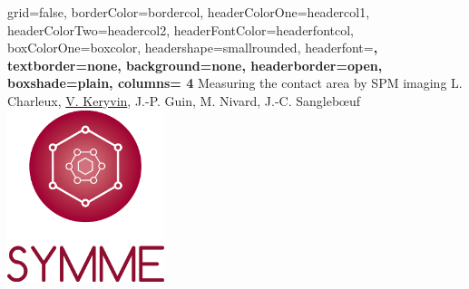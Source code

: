 \documentclass[a0paper,portrait]{baposter}
\begin{document}
\begin{poster}{
	grid=false,
	borderColor=bordercol,
	headerColorOne=headercol1,
	headerColorTwo=headercol2,
	headerFontColor=headerfontcol,
	boxColorOne=boxcolor,
	headershape=smallrounded,
	headerfont=\Large\sf\bf,
	textborder=none,
	background=none,
	headerborder=open,
    boxshade=plain,
    columns= 4
}
{}
{
Measuring the contact area by SPM imaging
}
{
L. Charleux, \underline{V. Keryvin}, J.-P. Guin, M. Nivard, J.-C. Sangleb\oe uf
}
{
\includegraphics[height = 5cm]{symme}
}



\end{poster}
\end{document}
